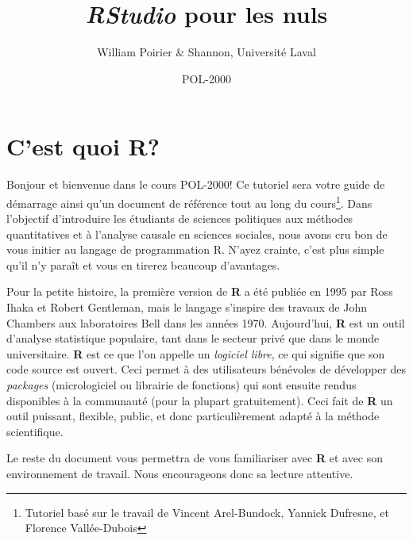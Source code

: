 \documentclass[10.5pt,a4paper]{article}
\title{\textbf{\emph{RStudio}} pour les nuls}
\author{William Poirier & Shannon, Université Laval}
\date{POL-2000}
\begin{document}
 

\restoregeometry %
\nopagecolor%

\tableofcontents

\pagebreak

\section{C'est quoi R?}
Bonjour et bienvenue dans le cours POL-2000! Ce tutoriel sera votre guide de démarrage ainsi qu'un document de référence tout au long du cours\footnote{Tutoriel basé sur le travail de Vincent Arel-Bundock, Yannick Dufresne, et Florence Vallée-Dubois}. Dans l'objectif d'introduire les étudiants de sciences politiques aux méthodes quantitatives et à l'analyse causale en sciences sociales, nous avons cru bon de vous initier au langage de programmation R. N'ayez crainte, c'est plus simple qu'il n'y paraît et vous en tirerez beaucoup d'avantages. 

Pour la petite histoire, la première version de \textbf{R} a été publiée en 1995 par Ross Ihaka et Robert Gentleman, mais le langage s'inspire des travaux de John Chambers aux laboratoires Bell dans les années 1970. Aujourd'hui, \textbf{R} est un outil d'analyse statistique populaire, tant dans le secteur privé que dans le monde universitaire. \textbf{R} est ce que l'on appelle un \textit{logiciel libre}, ce qui signifie que son code source est ouvert. Ceci permet à des utilisateurs bénévoles de développer des \textit{packages} (micrologiciel ou librairie de fonctions) qui sont ensuite rendus disponibles à la communauté (pour la plupart gratuitement). Ceci fait de \textbf{R} un outil puissant, flexible, public, et donc particulièrement adapté à la méthode scientifique. 

Le reste du document vous permettra de vous familiariser avec \textbf{R} et avec son environnement de travail. Nous encourageons donc sa lecture attentive.
\end{document}
